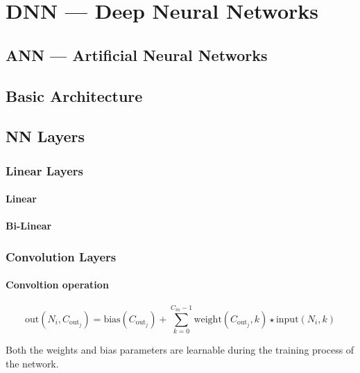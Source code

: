

\chapter{DNN --- Deep Neural Networks}
\section{ANN --- Artificial Neural Networks}
\section{Basic Architecture}

\section{NN Layers}
\subsection{Linear Layers}
\subsubsection{Linear}
\subsubsection{Bi-Linear}

\subsection{Convolution Layers}
\subsubsection{Convoltion operation}
\begin{equation} \label{eq:conv_operation}
    \text{out}(N_i, C_{\text{out}_j}) = \text{bias}(C_{\text{out}_j}) +
    \sum_{k = 0}^{C_{in} - 1} \text{weight}(C_{\text{out}_j}, k)
    \star \text{input}(N_i, k)  
\end{equation}

Both the weights and bias parameters are learnable during the training
process of the network.

